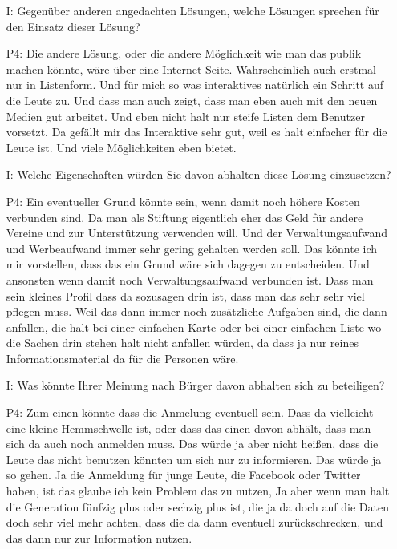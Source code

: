 \begin{itemize}
    \item[I:] Gegen{\"u}ber anderen angedachten L{\"o}sungen, welche L{\"o}sungen sprechen f{\"u}r den Einsatz dieser L{\"o}sung?
    \item[P4:] Die andere L{\"o}sung, oder die andere M{\"o}glichkeit wie man das publik machen k{\"o}nnte, w{\"a}re {\"u}ber eine Internet-Seite. Wahrscheinlich auch erstmal nur in Listenform. Und f{\"u}r mich so was interaktives nat{\"u}rlich ein Schritt auf die Leute zu. Und dass man auch zeigt, dass man eben auch mit den neuen Medien gut arbeitet. Und eben nicht halt nur steife Listen dem Benutzer vorsetzt. Da gef{\"a}llt mir das Interaktive sehr gut, weil es halt einfacher f{\"u}r die Leute ist. Und viele M{\"o}glichkeiten eben bietet.
    \item[I:] Welche Eigenschaften w{\"u}rden Sie davon abhalten diese L{\"o}sung einzusetzen?
    \item[P4:] Ein eventueller Grund k{\"o}nnte sein, wenn damit noch h{\"o}here Kosten verbunden sind. Da man als Stiftung eigentlich eher das Geld f{\"u}r andere Vereine und zur Unterst{\"u}tzung verwenden will. Und der Verwaltungsaufwand und Werbeaufwand immer sehr gering gehalten werden soll. Das k{\"o}nnte ich mir vorstellen, dass das ein Grund w{\"a}re sich dagegen zu entscheiden. Und ansonsten wenn damit noch Verwaltungsaufwand verbunden ist. Dass man sein kleines Profil dass da sozusagen drin ist, dass man das sehr sehr viel pflegen muss. Weil das dann immer noch zus{\"a}tzliche Aufgaben sind, die dann anfallen, die halt bei einer einfachen Karte oder bei einer einfachen Liste wo die Sachen drin stehen halt nicht anfallen w{\"u}rden, da dass ja nur reines Informationsmaterial da f{\"u}r die Personen w{\"a}re.
    \item[I:] Was k{\"o}nnte Ihrer Meinung nach B{\"u}rger davon abhalten sich zu beteiligen?
    \item[P4:] Zum einen k{\"o}nnte dass die Anmelung eventuell sein. Dass da vielleicht eine kleine Hemmschwelle ist, oder dass das einen davon abh{\"a}lt, dass man sich da auch noch anmelden muss. Das w{\"u}rde ja aber nicht hei{\ss}en, dass die Leute das nicht benutzen k{\"o}nnten um sich nur zu informieren. Das w{\"u}rde ja so gehen. Ja die Anmeldung f{\"u}r junge Leute, die Facebook oder Twitter haben, ist das glaube ich kein Problem das zu nutzen, Ja aber wenn man halt die Generation f{\"u}nfzig plus oder sechzig plus ist, die ja da doch auf die Daten doch sehr viel mehr achten, dass die da dann eventuell zur{\"u}ckschrecken, und das dann nur zur Information nutzen.

\end{itemize}
